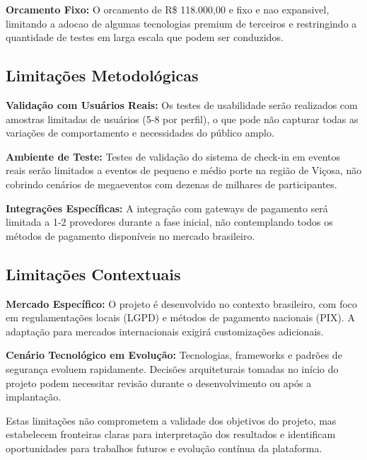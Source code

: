 \textbf{Orcamento Fixo:} O orcamento de R\$ 118.000,00 e fixo e nao expansivel, limitando a adocao de algumas tecnologias premium de terceiros e restringindo a quantidade de testes em larga escala que podem ser conduzidos.

\subsection{Limitações Metodológicas}

\textbf{Validação com Usuários Reais:} Os testes de usabilidade serão realizados com amostras limitadas de usuários (5-8 por perfil), o que pode não capturar todas as variações de comportamento e necessidades do público amplo.

\textbf{Ambiente de Teste:} Testes de validação do sistema de check-in em eventos reais serão limitados a eventos de pequeno e médio porte na região de Viçosa, não cobrindo cenários de megaeventos com dezenas de milhares de participantes.

\textbf{Integrações Específicas:} A integração com gateways de pagamento será limitada a 1-2 provedores durante a fase inicial, não contemplando todos os métodos de pagamento disponíveis no mercado brasileiro.

\subsection{Limitações Contextuais}

\textbf{Mercado Específico:} O projeto é desenvolvido no contexto brasileiro, com foco em regulamentações locais (LGPD) e métodos de pagamento nacionais (PIX). A adaptação para mercados internacionais exigirá customizações adicionais.

\textbf{Cenário Tecnológico em Evolução:} Tecnologias, frameworks e padrões de segurança evoluem rapidamente. Decisões arquiteturais tomadas no início do projeto podem necessitar revisão durante o desenvolvimento ou após a implantação.

Estas limitações não comprometem a validade dos objetivos do projeto, mas estabelecem fronteiras claras para interpretação dos resultados e identificam oportunidades para trabalhos futuros e evolução contínua da plataforma.

